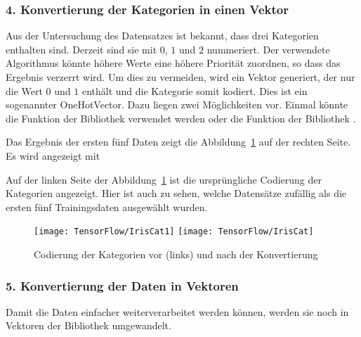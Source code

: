 \subsubsection{4. Konvertierung der Kategorien in einen Vektor}

Aus der Untersuchung des Datensatzes ist bekannt, dass drei Kategorien enthalten sind. Derzeit sind sie mit $0$, $1$ und $2$ nummeriert. Der verwendete Algorithmus könnte höhere Werte eine höhere Priorität zuordnen, so dass das Ergebnis verzerrt wird. Um dies zu vermeiden, wird ein Vektor generiert, der nur die
Wert $0$ und $1$ enthält und die Kategorie somit kodiert. Dies ist ein sogenannter \glqq OneHotVector\grqq{}. Dazu liegen zwei Möglichkeiten vor. Einmal könnte die Funktion  der Bibliothek  verwendet werden oder die Funktion  der Bibliothek .

\medskip



\medskip

Das Ergebnis der ersten fünf Daten zeigt die Abbildung~\ref{TensorFlowIrisCat} auf der rechten Seite. Es wird angezeigt mit

\medskip


\medskip

Auf der linken Seite der Abbildung~\ref{TensorFlowIrisCat} ist die ursprüngliche Codierung der Kategorien angezeigt. Hier ist auch zu sehen, welche Datensätze zufällig als die ersten fünf
Trainingsdaten ausgewählt wurden.

\begin{figure}[H]
	\begin{center}
		\texttt{[image: TensorFlow/IrisCat1]}
		\texttt{[image: TensorFlow/IrisCat]}
		\caption{Codierung der Kategorien vor (links) und nach der Konvertierung} 
		\label{TensorFlowIrisCat}
	\end{center}
\end{figure}


\subsubsection{5. Konvertierung der Daten in Vektoren}

Damit die Daten einfacher weiterverarbeitet werden können, werden sie noch in Vektoren der Bibliothek  umgewandelt.

